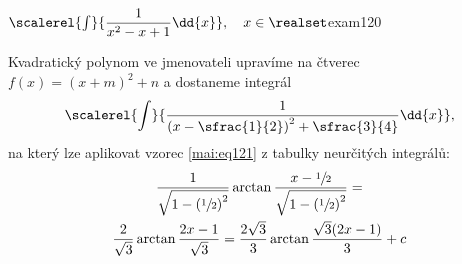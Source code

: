 \begin{mathexam}{\(\protect\scalerel{\int}{\dfrac{1}{x^2 - x + 1}\dd{x}},\quad
  x\in\realset\)}{exam120} 
  
  Kvadratický polynom ve jmenovateli upravíme na čtverec \(f(x) = (x + m)^2 + n\) a dostaneme
  integrál\[\scalerel{\int}{\dfrac{1}{\left(x-\sfrac{1}{2}\right)^2+\sfrac{3}{4}}\dd{x}},\] na který
  lze aplikovat vzorec \ref{mai:eq121} z tabulky neurčitých integrálů: 
  \begin{multline*}
    \dfrac{1}{\sqrt{1-\left(\sfrac{1}{2}\right)^2}}\arctan
    \dfrac{x-\sfrac{1}{2}}{\sqrt{1-\left(\sfrac{1}{2}\right)^2}} = \\
    \dfrac{2}{\sqrt{3}}\arctan\dfrac{2x-1}{\sqrt{3}}  =
    \dfrac{2\sqrt{3}}{3}\arctan\dfrac{\sqrt{3}(2x-1)}{3} + c
  \end{multline*}
\end{mathexam}